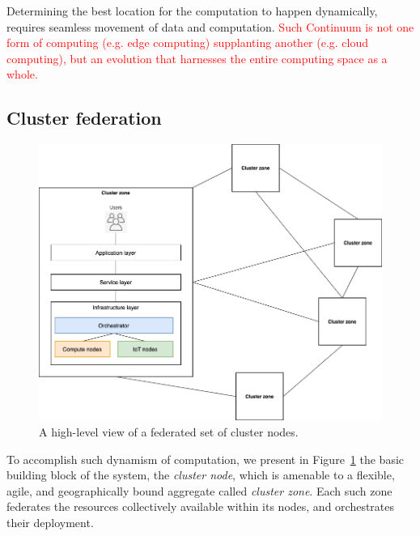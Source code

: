 
Determining the best location for the computation to happen dynamically, requires seamless movement of data and computation. \textcolor{red}{Such Continuum is not one form of computing (e.g. edge computing) supplanting another (e.g. cloud computing), but an evolution that harnesses the entire computing space as a whole.}

\subsection{Cluster federation}

\begin{figure}[ht]
\centering
\includegraphics[width=0.75\columnwidth]{figures/architecture-federation}
\caption{A high-level view of a federated set of cluster nodes.} \label{fig:architecture-federation}
\end{figure}

To accomplish such dynamism of computation, we present in Figure~\ref{fig:architecture-federation} 
the basic building block of the system, the \textit{cluster node}, which is amenable to a flexible, agile, and geographically bound aggregate called \textit{cluster zone}.
Each such zone federates the resources collectively available within its nodes, and orchestrates their deployment. 

